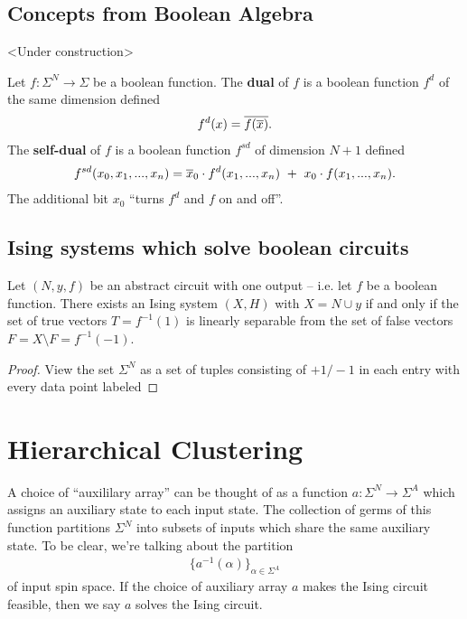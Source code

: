 \documentclass{article}
\begin{document}
\subsection{Concepts from Boolean Algebra}
\begin{center}
  <Under construction>
\end{center}

\begin{defn}\label{defn:dual-selfdual}
  Let $f:\Sigma^N \to \Sigma$ be a boolean function. The \textbf{dual} of $f$ is a boolean function $f^d$ of the same dimension defined
  \begin{align*}
    f^d(x) = \overline{f(\overline{x})}.
  \end{align*}
  The \textbf{self-dual} of $f$ is a boolean function $f^{sd}$ of dimension $N+1$ defined
  \begin{align*}
    f^{sd}(x_0, x_1,...,x_n) = \overline{x}_0\cdot f^d(x_1,...,x_n) ~+~ x_0\cdot f(x_1,...,x_n).
  \end{align*}
  The additional bit $x_0$ ``turns $f^d$ and $f$ on and off''.
\end{defn}

\subsection{Ising systems which solve boolean circuits}

\begin{prop}\label{prop:boolean-ising-svm-equiv}
  Let $(N, {y}, f)$ be an abstract circuit with one output -- i.e. let $f$ be a boolean function. There exists an Ising system $(X,H)$ with $X = N \cup {y}$ if and only if the set of true vectors $T = f^{-1}(1)$ is linearly separable from the set of false vectors $F = X \setminus F = f^{-1}(-1)$.
\end{prop}
\begin{proof}
  View the set $\Sigma^N$ as a set of tuples consisting of $+1/-1$ in each entry with every data point labeled 
\end{proof}
\section{Hierarchical Clustering}

A choice of ``auxililary array'' can be thought of as a function $a:\Sigma^N \to \Sigma^A$ which assigns an auxiliary state to each input state. The collection of germs of this function partitions $\Sigma^N$ into subsets of inputs which share the same auxiliary state. To be clear, we're talking about the partition
\begin{align*}
  \{a^{-1}(\alpha)\}_{\alpha \in \Sigma^A}
\end{align*}
of input spin space. If the choice of auxiliary array $a$ makes the Ising circuit feasible, then we say $a$ solves the Ising circuit.
\end{document}
